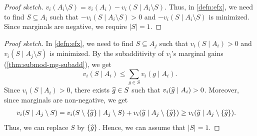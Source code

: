 \begin{proof}[Proof sketch]
$v_i(A_i \setminus S) = v_i(A_i) - v_i(S \mid A_i \setminus S)$.
Thus, in \cref{defn:efx}, we need to find $S \subseteq A_i$ such that
$-v_i(S \mid A_i \setminus S) > 0$ and $-v_i(S \mid A_i \setminus S)$ is minimized.
Since marginals are negative, we require $|S| = 1$.
\end{proof}

\begin{proof}[Proof sketch]
In \cref{defn:efx}, we need to find $S \subseteq A_j$ such that
$v_i(S \mid A_i) > 0$ and $v_i(S \mid A_j \setminus S)$ is minimized.
By the subadditivity of $v_i$'s marginal gains (\cref{thm:submod-mg-subadd}), we get
\[ v_i(S \mid A_i) \le \sum_{g \in S} v_i(g \mid A_i). \]
Since $v_i(S \mid A_i) > 0$, there exists $\widehat{g} \in S$ such that $v_i(\widehat{g} \mid A_i) > 0$.
Moreover, since marginals are non-negative, we get
\begin{align*}
& v_i(S \mid A_j \setminus S)
\relax= v_i(S \setminus \{\widehat{g}\} \mid A_j \setminus S) + v_i(\widehat{g} \mid A_j \setminus \{\widehat{g}\})
\relax\ge v_i(\widehat{g} \mid A_j \setminus \{\widehat{g}\}).
\end{align*}
Thus, we can replace $S$ by $\{\widehat{g}\}$.
Hence, we can assume \wLoG{} that $|S| = 1$.
\end{proof}

